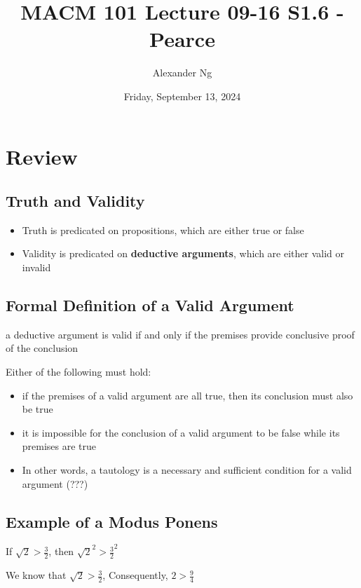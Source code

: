 \documentclass[12pt]{article}
\begin{document}
\title{MACM 101 Lecture 09-16 S1.6 - Pearce}
\author{Alexander Ng}
\date{Friday, September 13, 2024}

\maketitle

\section*{Review}

\subsection{Truth and Validity}
\begin{itemize}
  \item Truth is predicated on propositions, which are either true or false
  \item Validity is predicated on \textbf{deductive arguments}, which are either valid or invalid
\end{itemize}

\subsection{Formal Definition of a Valid Argument}

a deductive argument is valid if and only if the premises provide conclusive
proof of the conclusion

Either of the following must hold:

\begin{itemize}
  \item if the premises of a valid argument are all true, then its conclusion must also be true
  \item it is impossible for the conclusion of a valid argument to be false while its premises are true
  \item In other words, a tautology is a necessary and sufficient condition for a valid argument (???)
\end{itemize}

\subsection{Example of a Modus Ponens}

If $\sqrt{2} > \frac{3}{2}$, then $\sqrt{2}^2 > \frac{3}{2}^2$

We know that $\sqrt{2}>\frac{3}{2}$, Consequently, $2 > \frac{9}{4}$
\end{document}
